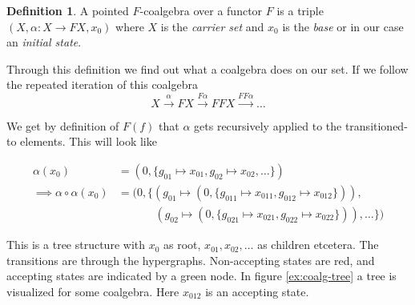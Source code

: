 \documentclass[12pt]{article}
\theoremstyle{definition}
\newtheorem{definition}[theorem]{Definition}
\newcommand{\1}{\mathbbm{1}}
\begin{document}
\begin{definition}
    A pointed $F$-coalgebra over a functor $F$ is a triple $(X, \alpha: X\to FX, x_0)$ where $X$ is the \emph{carrier set} and $x_0$ is the \emph{base} or in our case an \emph{initial state}.
\end{definition}

Through this definition we find out what a coalgebra does on our set. If we follow the repeated iteration of this coalgebra
\[
    X\xrightarrow{\alpha} FX \xrightarrow{F\alpha} FFX \xrightarrow{FF\alpha} \dots
\]

We get by definition of $F(f)$ that $\alpha$ gets recursively applied to the transitioned-to elements. This will look like

\begin{align*}
    \alpha(x_0) &= (0, \{g_{01}\mapsto x_{01}, g_{02}\mapsto x_{02}, \dots\})\\
    \implies \alpha\circ\alpha(x_0) &= (0, \{(g_{01}\mapsto (0, \{g_{011}\mapsto x_{011}, g_{012}\mapsto x_{012}\})),\\
    &\hspace{40pt}(g_{02}\mapsto (0, \{g_{021}\mapsto x_{021}, g_{022}\mapsto x_{022}\})), \dots\})
\end{align*}

This is a tree structure with $x_0$ as root, $x_{01}, x_{02}, \dots$ as children etcetera. The transitions are through the hypergraphs. Non-accepting states are red, and accepting states are indicated by a green node. In figure \ref{ex:coalg-tree} a tree is visualized for some coalgebra. Here $x_{012}$ is an accepting state.
\end{document}
